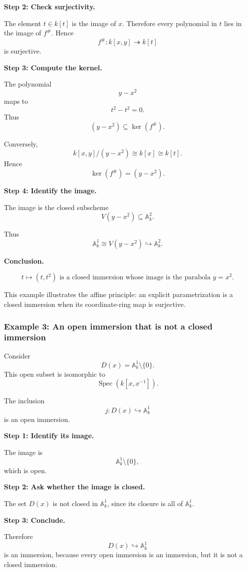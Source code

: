 \documentclass[12pt,a4paper]{article}
\theoremstyle{notespace}
\begin{document}
\textbf{Step 2: Check surjectivity.}

The element \(t\in k[t]\) is the image of \(x\). Therefore every polynomial in \(t\) lies in the image of \(f^{\#}\). Hence
\[
f^{\#}:k[x,y]\twoheadrightarrow k[t]
\]
is surjective.

\textbf{Step 3: Compute the kernel.}

The polynomial
\[
y-x^{2}
\]
maps to
\[
t^{2}-t^{2}=0.
\]
Thus
\[
(y-x^{2})\subseteq \ker(f^{\#}).
\]

Conversely,
\[
k[x,y]/(y-x^{2})\cong k[x]\cong k[t].
\]
Hence
\[
\ker(f^{\#})=(y-x^{2}).
\]

\textbf{Step 4: Identify the image.}

The image is the closed subscheme
\[
V(y-x^{2})\subseteq \mathbb{A}^{2}_{k}.
\]

Thus
\[
\mathbb{A}^{1}_{k}
\cong
V(y-x^{2})
\hookrightarrow
\mathbb{A}^{2}_{k}.
\]

\textbf{Conclusion.}

\[
\boxed{
	t\longmapsto (t,t^{2})
	\text{ is a closed immersion whose image is the parabola }
	y=x^{2}.
}
\]

This example illustrates the affine principle: an explicit parametrization is a closed immersion when its coordinate-ring map is surjective.

\subsubsection{Example 3: An open immersion that is not a closed immersion}

Consider
\[
D(x)
=
\mathbb{A}^{1}_{k}\setminus\{0\}.
\]
This open subset is isomorphic to
\[
\operatorname{Spec}(k[x,x^{-1}]).
\]

The inclusion
\[
j:D(x)\hookrightarrow \mathbb{A}^{1}_{k}
\]
is an open immersion.

\textbf{Step 1: Identify its image.}

The image is
\[
\mathbb{A}^{1}_{k}\setminus\{0\},
\]
which is open.

\textbf{Step 2: Ask whether the image is closed.}

The set \(D(x)\) is not closed in \(\mathbb{A}^{1}_{k}\), since its closure is all of \(\mathbb{A}^{1}_{k}\).

\textbf{Step 3: Conclude.}

Therefore
\[
D(x)\hookrightarrow \mathbb{A}^{1}_{k}
\]
is an immersion, because every open immersion is an immersion, but it is not a closed immersion.
\end{document}
